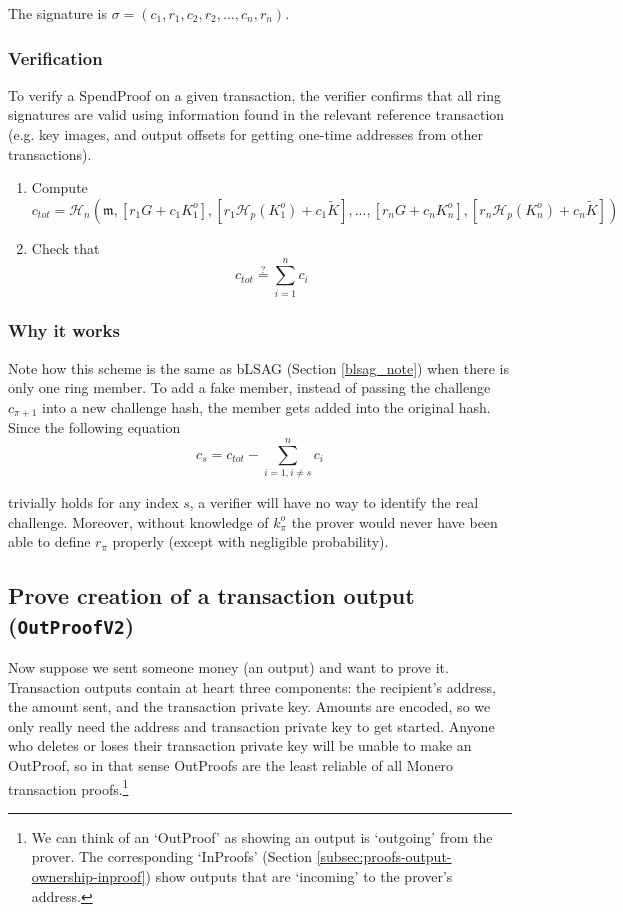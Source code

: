 The signature is $\sigma = (c_1, r_1,c_2,r_2,...,c_n,r_n)$.

\subsubsection*{Verification}

To verify a SpendProof on a given transaction, the verifier confirms that all ring signatures are valid using information found in the relevant reference transaction (e.g. key images, and output offsets for getting one-time addresses from other transactions).

\begin{enumerate}
	\item Compute
	\[c_{tot} = \mathcal{H}_n(\mathfrak{m},[r_1 G + c_1 K^o_1],[r_1 \mathcal{H}_p(K^o_1) + c_1 \tilde{K}],...,[r_n G + c_n K^o_n],[r_n \mathcal{H}_p(K^o_n) + c_n \tilde{K}])\]

	\item Check that
	\[c_{tot} \stackrel{?}{=} \sum^{n}_{i=1} c_i\]
\end{enumerate}

\subsubsection*{Why it works}

Note how this scheme is the same as bLSAG (Section \ref{blsag_note}) when there is only one ring member. To add a fake member, instead of passing the challenge $c_{\pi+1}$ into a new challenge hash, the member gets added into the original hash. Since the following equation\vspace{.175cm}
\[c_{s} = c_{tot} - \sum^{n}_{i=1,i\neq s} c_i\]

trivially holds for any index $s$, a verifier will have no way to identify the real challenge. Moreover, without knowledge of $k^o_{\pi}$ the prover would never have been able to define $r_{\pi}$ properly (except with negligible probability).


\subsection{Prove creation of a transaction output ({\tt OutProofV2})}
\label{subsec:proofs-output-creator-outproof}

Now suppose we sent someone money (an output) and want to prove it. Transaction outputs contain at heart three components: the recipient's address, the amount sent, and the transaction private key. Amounts are encoded, so we only really need the address and transaction private key to get started. Anyone who deletes or loses their transaction private key will be unable to make an OutProof, so in that sense OutProofs are the least reliable of all Monero transaction proofs.\footnote{We can think of an `OutProof' as showing an output is `outgoing' from the prover. The corresponding `InProofs' (Section \ref{subsec:proofs-output-ownership-inproof}) show outputs that are `incoming' to the prover's address.}

